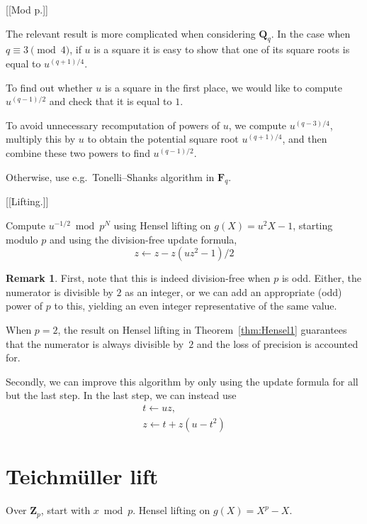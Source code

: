 \documentclass[a4paper,11pt]{article}
\theoremstyle{definition}
\newtheorem{rem}{Remark}
\begin{document}
[[Mod p.]]

The relevant result is more complicated when considering $\mathbf{Q}_q$.  
        In the case when $q \equiv 3 \pmod{4}$, if $u$ is a square 
        it is easy to show that one of its square roots is equal to 
        $u^{(q+1)/4}$.

        To find out whether $u$ is a square in the first place, we 
        would like to compute $u^{(q-1)/2}$ and check that it is 
        equal to $1$.

        To avoid unnecessary recomputation of powers of $u$, we 
        compute $u^{(q-3)/4}$, multiply this by $u$ to obtain 
        the potential square root $u^{(q+1)/4}$, and then combine 
        these two powers to find $u^{(q-1)/2}$.

Otherwise, use e.g.\ Tonelli--Shanks algorithm in $\mathbf{F}_q$.

[[Lifting.]]

Compute $u^{-1/2} \bmod p^N$ using Hensel lifting on $g(X) = u^2 X - 1$, 
starting modulo $p$ and using the division-free update formula,
\begin{equation}
z \gets z - z (u z^2 - 1) / 2
\end{equation}

\begin{rem}
First, note that this is indeed division-free when $p$ is odd.  Either, the numerator is 
divisible by $2$ as an integer, or we can add an appropriate (odd) power 
of $p$ to this, yielding an even integer representative of the same value.

When $p = 2$, the result on Hensel lifting in Theorem~\ref{thm:Hensel1} 
guarantees that the numerator is always divisible by~$2$ and the loss 
of precision is accounted for.

Secondly, we can improve this algorithm by only using the update formula 
for all but the last step.  In the last step, we can instead use 
\begin{align}
t \gets u z, \\
z \gets t + z (u - t^2)
\end{align}
\end{rem}

\section{Teichm\"uller lift}

Over $\mathbf{Z}_p$, start with $x \bmod p$.  Hensel lifting on $g(X) = X^p - X$.
\end{document}
